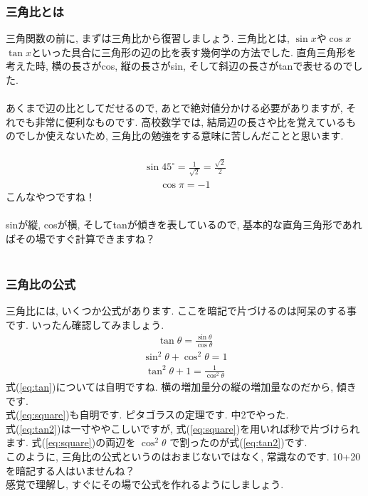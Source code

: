 \documentclass[11pt,a4paper]{jsarticle}
\begin{document}
\subsubsection{三角比とは}
三角関数の前に, まずは三角比から復習しましょう. 三角比とは, $\sin x$や$\cos x$ $\tan x$といった具合に三角形の辺の比を表す幾何学の方法でした. 直角三角形を考えた時, 横の長さがcos, 縦の長さがsin, そして斜辺の長さがtanで表せるのでした. \\
\\
あくまで辺の比としてだせるので, あとで絶対値分かける必要がありますが, それでも非常に便利なものです. 高校数学では, 結局辺の長さや比を覚えているものでしか使えないため, 三角比の勉強をする意味に苦しんだことと思います.\\
\\
\begin{eqnarray}
\sin 45^\circ = \frac{1}{\sqrt{2}} = \frac{\sqrt{2}}2
\end{eqnarray}
\begin{eqnarray}
\cos \pi = -1
\end{eqnarray}
こんなやつですね！\\
\\
sinが縦, cosが横, そしてtanが傾きを表しているので, 基本的な直角三角形であればその場ですぐ計算できますね？\\
\\
\subsubsection{三角比の公式}
三角比には, いくつか公式があります. ここを暗記で片づけるのは阿呆のする事です. いったん確認してみましょう.
\begin{eqnarray}
\tan \theta = \frac{\sin\theta}{\cos\theta}
\label{eq:tan}
\end{eqnarray}
\begin{eqnarray}
\sin^2 \theta + \cos^2\theta = 1
\label{eq:square}
\end{eqnarray}
\begin{eqnarray}
\tan^2\theta + 1 = \frac{1}{\cos^2\theta}
\label{eq:tan2}
\end{eqnarray}
式(\ref{eq:tan})については自明ですね. 横の増加量分の縦の増加量なのだから, 傾きです.\\
式(\ref{eq:square})も自明です. ピタゴラスの定理です. 中2でやった. \\
式(\ref{eq:tan2})は一寸ややこしいですが, 式(\ref{eq:square})を用いれば秒で片づけられます. 式(\ref{eq:square})の両辺を $\cos^2\theta$ で割ったのが式(\ref{eq:tan2})です.\\
このように, 三角比の公式というのはおまじないではなく, 常識なのです. 10+20を暗記する人はいませんね？\\
感覚で理解し, すぐにその場で公式を作れるようにしましょう. 
\end{document}
